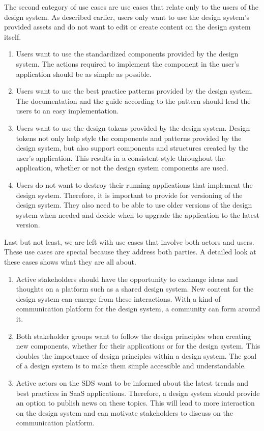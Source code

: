 The second category of use cases are use cases that relate only to the users of the design system. As described earlier, users only want to use the design system's provided assets and do not want to edit or create content on the design system itself.
\begin{enumerate}
    \item Users want to use the standardized components provided by the design system. The actions required to implement the component in the user's application should be as simple as possible.
    \item Users want to use the best practice patterns provided by the design system. The documentation and the guide according to the pattern should lead the users to an easy implementation.
    \item Users want to use the design tokens provided by the design system. Design tokens not only help style the components and patterns provided by the design system, but also support components and structures created by the user's application. This results in a consistent style throughout the application, whether or not the design system components are used.
    \item Users do not want to destroy their running applications that implement the design system. Therefore, it is important to provide for versioning of the design system. They also need to be able to use older versions of the design system when needed and decide when to upgrade the application to the latest version.
\end{enumerate}
Last but not least, we are left with use cases that involve both actors and users. These use cases are special because they address both parties. A detailed look at these cases shows what they are all about.
\begin{enumerate}
    \item Active stakeholders should have the opportunity to exchange ideas and thoughts on a platform such as a shared design system. New content for the design system can emerge from these interactions. With a kind of communication platform for the design system, a community can form around it. 
    \item Both stakeholder groups want to follow the design principles when creating new components, whether for their applications or for the design system. This doubles the importance of design principles within a design system. The goal of a design system is to make them simple accessible and understandable.
    \item Active actors on the SDS want to be informed about the latest trends and best practices in \ac{SaaS} applications. Therefore, a design system should provide an option to publish news on these topics. This will lead to more interaction on the design system and can motivate stakeholders to discuss on the communication platform.
\end{enumerate}

